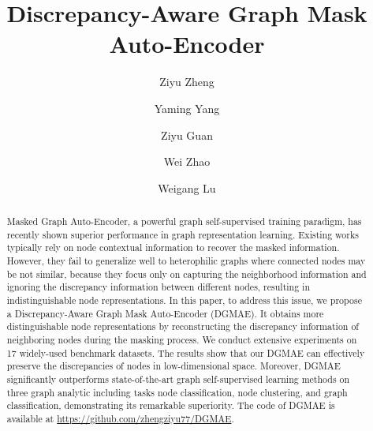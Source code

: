 \documentclass[sigconf]{acmart}
\begin{document}
\title{Discrepancy-Aware Graph Mask Auto-Encoder}

\author{Ziyu Zheng}


\author{Yaming Yang}


\author{Ziyu Guan}


\author{Wei Zhao}


\author{Weigang Lu}



\begin{abstract}
Masked Graph Auto-Encoder, a powerful graph self-supervised training paradigm, has recently shown superior performance in graph representation learning. Existing works typically rely on node contextual information to recover the masked information. However, they fail to generalize well to heterophilic graphs where connected nodes may be not similar, because they focus only on capturing the neighborhood information and ignoring the discrepancy information between different nodes, resulting in indistinguishable node representations. In this paper, to address this issue, we propose a Discrepancy-Aware Graph Mask Auto-Encoder (DGMAE). It obtains more distinguishable node representations by reconstructing the discrepancy information of neighboring nodes during the masking process. We conduct extensive experiments on 17 widely-used benchmark datasets. The results show that our DGMAE can effectively preserve the discrepancies of nodes in low-dimensional space. Moreover, DGMAE significantly outperforms state-of-the-art graph self-supervised learning methods on three graph analytic including tasks node classification, node clustering, and graph classification, demonstrating its remarkable superiority. The code of DGMAE is available at \url{https://github.com/zhengziyu77/DGMAE}.
\end{abstract}
\end{document}
